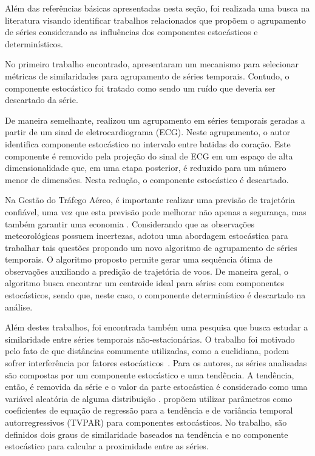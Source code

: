 
Além das referências básicas apresentadas nesta seção, foi realizada uma busca na literatura visando identificar trabalhos relacionados que propõem o agrupamento de séries considerando as influências dos componentes estocásticos e determinísticos.

No primeiro trabalho encontrado,  apresentaram um mecanismo para selecionar métricas de similaridades para agrupamento de séries temporais. Contudo, o componente estocástico foi tratado como sendo um ruído que deveria ser descartado da série. 

De maneira semelhante,  realizou um agrupamento em séries temporais geradas a partir de um sinal de eletrocardiograma (ECG). Neste agrupamento, o autor identifica componente estocástico no intervalo entre batidas do coração. Este componente é removido pela projeção do sinal de ECG em um espaço de alta dimensionalidade que, em uma etapa posterior, é reduzido para um número menor de dimensões. Nesta redução, o componente estocástico é descartado. 

Na Gestão do Tráfego Aéreo, é importante realizar uma previsão de trajetória confiável, uma vez que esta previsão pode melhorar não apenas a segurança, mas também garantir uma economia \cite{Ayhan2016}. Considerando que as observações meteorológicas possuem incertezas,   adotou uma abordagem estocástica para trabalhar tais questões propondo um novo algoritmo de agrupamento de séries temporais. O algoritmo proposto permite gerar uma sequência ótima de observações auxiliando a predição de trajetória de voos. De maneira geral, o algoritmo busca encontrar um centroide ideal para séries com componentes estocásticos, sendo que, neste caso, o componente determinístico é descartado na análise.

Além destes trabalhos, foi encontrada também uma pesquisa que busca estudar a similaridade entre séries temporais não-estacionárias. O trabalho foi motivado pelo fato de que distâncias comumente utilizadas, como a euclidiana, podem sofrer interferência por fatores estocásticos~\cite{nonsta}. Para os autores, as séries analisadas são compostas por um componente estocástico e uma tendência. A tendência, então, é removida da série e o valor da parte estocástica é considerado como uma variável aleatória de alguma distribuição .  propõem utilizar parâmetros como coeficientes de equação de regressão para a tendência e de variância temporal autorregressivos (TVPAR) para componentes estocásticos. No trabalho, são definidos dois graus de similaridade baseados na tendência e no componente estocástico para calcular a proximidade entre as séries.

